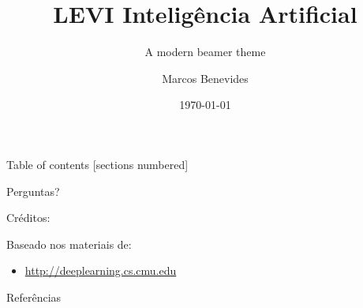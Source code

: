 \documentclass[10pt]{beamer}
\title{LEVI \- Inteligência Artificial}
\subtitle{A modern beamer theme}
\date{\today}
\author{Marcos Benevides}
\institute{Universidade Federal do Maranhão}
\theoremstyle{definition}
\begin{document}
\maketitle

\begin{frame}{Table of contents}
  [sections numbered]
  \tableofcontents%
\end{frame}







{
\begin{frame}[standout]
  Perguntas?
\end{frame}
}

\begin{frame}{Créditos:}

  Baseado nos materiais de:
  \begin{itemize}
    \item \href{http://deeplearning.cs.cmu.edu/}{http://deeplearning.cs.cmu.edu}
  \end{itemize}

\end{frame}


\begin{frame}[allowframebreaks]{Referências}

  
  

\end{frame}
\end{document}
